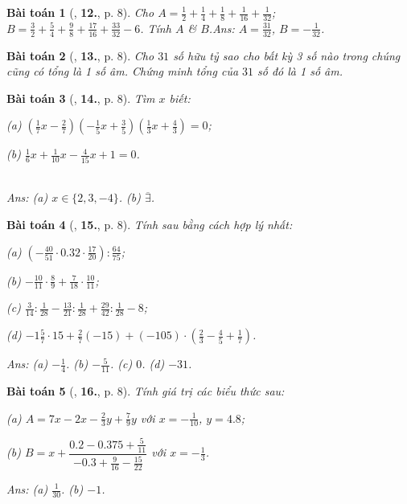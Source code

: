 \documentclass{article}
\numberwithin{equation}{section}
\newtheorem{baitoan}{Bài toán}
\begin{document}
\begin{baitoan}[\cite{Tuyen_Toan_7}, \textbf{12.}, p. 8]
	Cho $A = \frac{1}{2} + \frac{1}{4} + \frac{1}{8} + \frac{1}{16} + \frac{1}{32}$; $B = \frac{3}{2} + \frac{5}{4} + \frac{9}{8} + \frac{17}{16} + \frac{33}{32} - 6$. Tính $A$ \& $B$.\hfill\textsf{Ans:} $A = \frac{31}{32}$, $B = -\frac{1}{32}$.
\end{baitoan}

\begin{baitoan}[\cite{Tuyen_Toan_7}, \textbf{13.}, p. 8]
	Cho $31$ số hữu tỷ sao cho bất kỳ 3 số nào trong chúng cũng có tổng là 1 số âm. Chứng minh tổng của $31$ số đó là 1 số âm.
\end{baitoan}

\begin{baitoan}[\cite{Tuyen_Toan_7}, \textbf{14.}, p. 8]
	Tìm $x$ biết:
	\begin{enumerate*}
		\item[(a)] $\left(\frac{1}{7}x - \frac{2}{7}\right)\left(-\frac{1}{5}x + \frac{3}{5}\right)\left(\frac{1}{3}x + \frac{4}{3}\right) = 0$;
		\item[(b)] $\frac{1}{6}x + \frac{1}{10}x - \frac{4}{15}x + 1 = 0$.
	\end{enumerate*}\\\mbox{}\hfill\textsf{Ans:} (a) $x\in\{2,3,-4\}$. (b) $\overline{\exists}$.
\end{baitoan}

\begin{baitoan}[\cite{Tuyen_Toan_7}, \textbf{15.}, p. 8]
	Tính sau bằng cách hợp lý nhất:
	\begin{enumerate*}
		\item[(a)] $\left(-\frac{40}{51}\cdot 0.32\cdot\frac{17}{20}\right):\frac{64}{75}$;
		\item[(b)] $-\frac{10}{11}\cdot\frac{8}{9} + \frac{7}{18}\cdot\frac{10}{11}$;
		\item[(c)] $\frac{3}{14}:\frac{1}{28} - \frac{13}{21}:\frac{1}{28} + \frac{29}{42}:\frac{1}{28} - 8$;
		\item[(d)] $-1\frac{5}{7}\cdot 15 + \frac{2}{7}(-15) + (-105)\cdot\left(\frac{2}{3} - \frac{4}{5} + \frac{1}{7}\right)$.
	\end{enumerate*}\hfill\textsf{Ans:} (a) $-\frac{1}{4}$. (b) $-\frac{5}{11}$. (c) $0$. (d) $-31$.
\end{baitoan}

\begin{baitoan}[\cite{Tuyen_Toan_7}, \textbf{16.}, p. 8]
	Tính giá trị các biểu thức sau:
	\begin{enumerate*}
		\item[(a)] $A = 7x - 2x - \frac{2}{3}y + \frac{7}{9}y$ với $x = -\frac{1}{10}$, $y = 4.8$;
		\item[(b)] $B = x + \dfrac{0.2 - 0.375 + \frac{5}{11}}{-0.3 + \frac{9}{16} - \frac{15}{22}}$ với $x = -\frac{1}{3}$. 
	\end{enumerate*}\hfill\textsf{Ans:} (a) $\frac{1}{30}$. (b) $-1$.
\end{baitoan}
\end{document}
